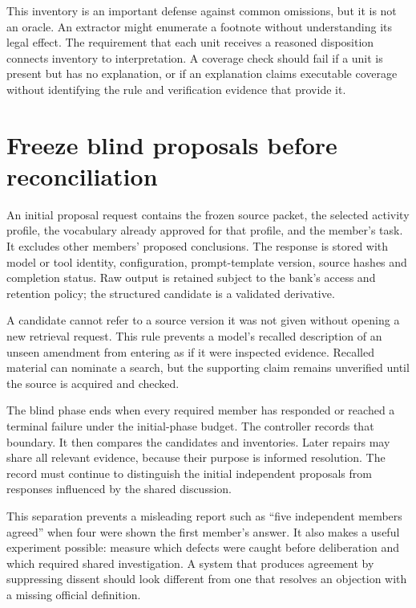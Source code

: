 This inventory is an important defense against common omissions, but it is not
an oracle. An extractor might enumerate a footnote without understanding its
legal effect. The requirement that each unit receives a reasoned disposition
connects inventory to interpretation. A coverage check should fail if a unit is
present but has no explanation, or if an explanation claims executable coverage
without identifying the rule and verification evidence that provide it.

\section{Freeze blind proposals before reconciliation}

An initial proposal request contains the frozen source packet, the selected
activity profile, the vocabulary already approved for that profile, and the
member's task. It excludes other members' proposed conclusions. The response is
stored with model or tool identity, configuration, prompt-template version, source
hashes and completion status. Raw output is retained subject to the bank's access
and retention policy; the structured candidate is a validated derivative.

A candidate cannot refer to a source version it was not given without opening a
new retrieval request. This rule prevents a model's recalled description of an
unseen amendment from entering as if it were inspected evidence. Recalled
material can nominate a search, but the supporting claim remains unverified
until the source is acquired and checked.

The blind phase ends when every required member has responded or reached a
terminal failure under the initial-phase budget. The controller records that
boundary. It then compares the candidates and inventories. Later repairs may
share all relevant evidence, because their purpose is informed resolution. The
record must continue to distinguish the initial independent proposals from
responses influenced by the shared discussion.

This separation prevents a misleading report such as ``five independent members
agreed'' when four were shown the first member's answer. It also makes a useful
experiment possible: measure which defects were caught before deliberation and
which required shared investigation. A system that produces agreement by
suppressing dissent should look different from one that resolves an objection
with a missing official definition.

